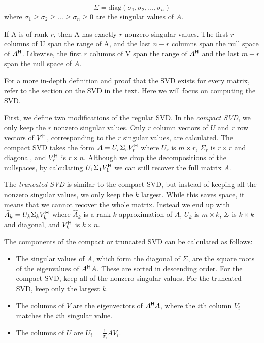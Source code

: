 \begin{equation*}
\Sigma = \mbox{diag}(\sigma_1,\sigma_2,\ldots,\sigma_n)
\end{equation*}
where $\sigma_1 \geq \sigma_2 \geq \ldots \geq \sigma_n \geq 0$ are the singular values of $A$.

If A is of rank $r$, then A has exactly $r$ nonzero singular values.
The first $r$ columns of U span the range of A, and the last $n -r$ columns span the null space of $A^{\mathsf H}$.
Likewise, the first $r$ columns of V span the range of $A^{\mathsf H}$ and the last $m - r$ span the null space of $A$.

For a more in-depth definition and proof that the SVD exists for every matrix, refer to the section on the SVD in the text.
Here we will focus on computing the SVD.

First, we define two modifications of the regular SVD.
In the \emph{compact SVD}, we only keep the $r$ nonzero singular values.
Only $r$ column vectors of $U$ and $r$ row vectors of $V^{\mathsf H}$, corresponding to the $r$ singular values, are calculated.
The compact SVD takes the form $A= U_r \Sigma_r V_r^{\mathsf H}$ where $U_r$ is $m\times r$, $\Sigma_r$ is $r\times r$ and diagonal, and $V_r^{\mathsf H}$ is $r\times n$.
Although we drop the decompositions of the nullspaces, by calculating $U_1 \Sigma_1 V_1^{\mathsf H}$ we can still recover the full matrix $A$.

The \emph{truncated SVD} is similar to the compact SVD, but instead of keeping all the nonzero singular values, we only keep the $k$ largest.
While this saves space, it means that we cannot recover the whole matrix.
Instead we end up with $\widehat A_k = U_k\Sigma_k V_k^{\mathsf H}$ where $\widehat A_k$ is a rank $k$ approximation of $A$, $U_k$ is $m\times k$, $\Sigma$ is $k \times k$ and diagonal, and $V_k^{\mathsf H}$ is $k \times n$.

The components of the compact or truncated SVD can be calculated as follows:
\begin{itemize}
\item The singular values of $A$, which form the diagonal of $\Sigma$, are the square roots of the eigenvalues of $A^{\mathsf H} A$.
These are sorted in descending order.
For the compact SVD, keep all of the nonzero singular values.
For the truncated SVD, keep only the largest $k$.
\item The columns of $V$ are the eigenvectors of $A^{\mathsf H} A$, where the $i$th column $V_i$ matches the $i$th singular value.
\item The columns of $U$ are $U_i = \frac{1}{\sigma_i} AV_i$.
\end{itemize}

